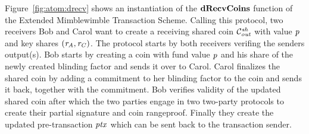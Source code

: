 Figure~\cref{fig:atom:drecv} shows an instantiation of the $\mathbf{dRecvCoins}$ function of the Extended Mimblewimble Transaction Scheme.
Calling this protocol, two receivers Bob and Carol want to create a receiving shared coin $\mathcal{C}_{\mathit{out}}^{\mathit{sh}}$ with value $\mathit{p}$ and key shares $(\mathit{r}_{\mathit{A}}, \mathit{r}_{\mathit{C}})$.
The protocol starts by both receivers verifing the senders output(s).
Bob starts by creating a coin with fund value $\mathit{p}$ and his share of the newly created blinding factor and sends it over to Carol.
Carol finalizes the shared coin by adding a commitment to her blinding factor to the coin and sends it back, together with the commitment.
Bob verifies validity of the updated shared coin after which the two parties engage in two two-party protocols to create their partial signature and coin rangeproof.
Finally they create the updated pre-transaction $\mathit{ptx}$ which can be sent back to the transaction sender.

